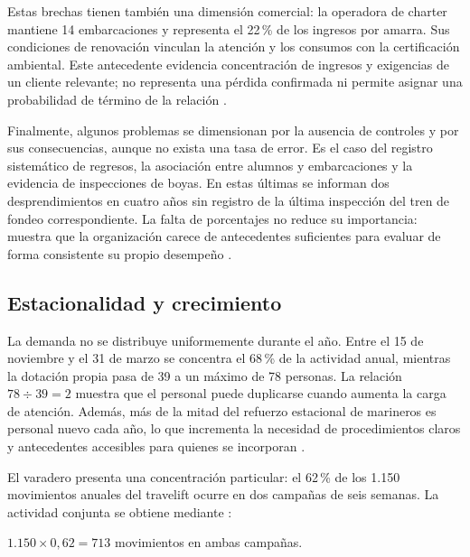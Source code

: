 Estas brechas tienen también una dimensión comercial: la operadora de charter mantiene 14 embarcaciones y representa el 22\,\% de los ingresos por amarra. Sus condiciones de renovación vinculan la atención y los consumos con la certificación ambiental. Este antecedente evidencia concentración de ingresos y exigencias de un cliente relevante; no representa una pérdida confirmada ni permite asignar una probabilidad de término de la relación \parencite[cap.~1, p.~5]{pucv-caso07-2026}.

Finalmente, algunos problemas se dimensionan por la ausencia de controles y por sus consecuencias, aunque no exista una tasa de error. Es el caso del registro sistemático de regresos, la asociación entre alumnos y embarcaciones y la evidencia de inspecciones de boyas. En estas últimas se informan dos desprendimientos en cuatro años sin registro de la última inspección del tren de fondeo correspondiente. La falta de porcentajes no reduce su importancia: muestra que la organización carece de antecedentes suficientes para evaluar de forma consistente su propio desempeño \parencite[cap.~4, seccs.~4.4, 4.9 y 4.10, pp.~10-12]{pucv-caso07-2026}.

\subsection{Estacionalidad y crecimiento} %
\label{sec:estacionalidad_crecimiento}

La demanda no se distribuye uniformemente durante el año. Entre el 15 de noviembre y el 31 de marzo se concentra el 68\,\% de la actividad anual, mientras la dotación propia pasa de 39 a un máximo de 78 personas. La relación $78 \div 39 = 2$ muestra que el personal puede duplicarse cuando aumenta la carga de atención. Además, más de la mitad del refuerzo estacional de marineros es personal nuevo cada año, lo que incrementa la necesidad de procedimientos claros y antecedentes accesibles para quienes se incorporan \parencite[cap.~2, seccs.~2.2 y 2.4, pp.~6-7]{pucv-caso07-2026}.

El varadero presenta una concentración particular: el 62\,\% de los 1.150 movimientos anuales del travelift ocurre en dos campañas de seis semanas. La actividad conjunta se obtiene mediante \parencite[cap.~4, secc.~4.6, p.~11]{pucv-caso07-2026}:

\begin{center}
    $1.150 \times 0{,}62 = 713$ movimientos en ambas campañas.
\end{center}

